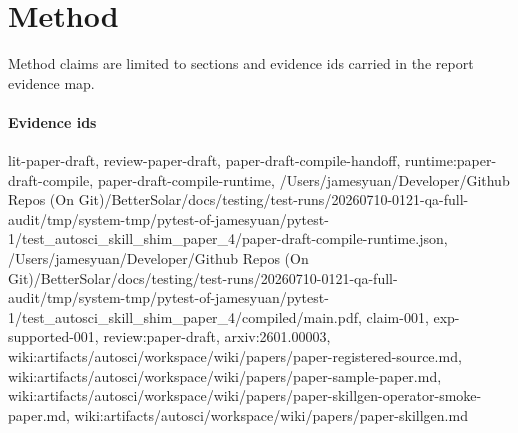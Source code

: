 \section{Method}
Method claims are limited to sections and evidence ids carried in the report evidence map.

\paragraph{Evidence ids} lit-paper-draft, review-paper-draft, paper-draft-compile-handoff, runtime:paper-draft-compile, paper-draft-compile-runtime, /Users/jamesyuan/Developer/Github Repos (On Git)/BetterSolar/docs/testing/test-runs/20260710-0121-qa-full-audit/tmp/system-tmp/pytest-of-jamesyuan/pytest-1/test\_autosci\_skill\_shim\_paper\_4/paper-draft-compile-runtime.json, /Users/jamesyuan/Developer/Github Repos (On Git)/BetterSolar/docs/testing/test-runs/20260710-0121-qa-full-audit/tmp/system-tmp/pytest-of-jamesyuan/pytest-1/test\_autosci\_skill\_shim\_paper\_4/compiled/main.pdf, claim-001, exp-supported-001, review:paper-draft, arxiv:2601.00003, wiki:artifacts/autosci/workspace/wiki/papers/paper-registered-source.md, wiki:artifacts/autosci/workspace/wiki/papers/paper-sample-paper.md, wiki:artifacts/autosci/workspace/wiki/papers/paper-skillgen-operator-smoke-paper.md, wiki:artifacts/autosci/workspace/wiki/papers/paper-skillgen.md
